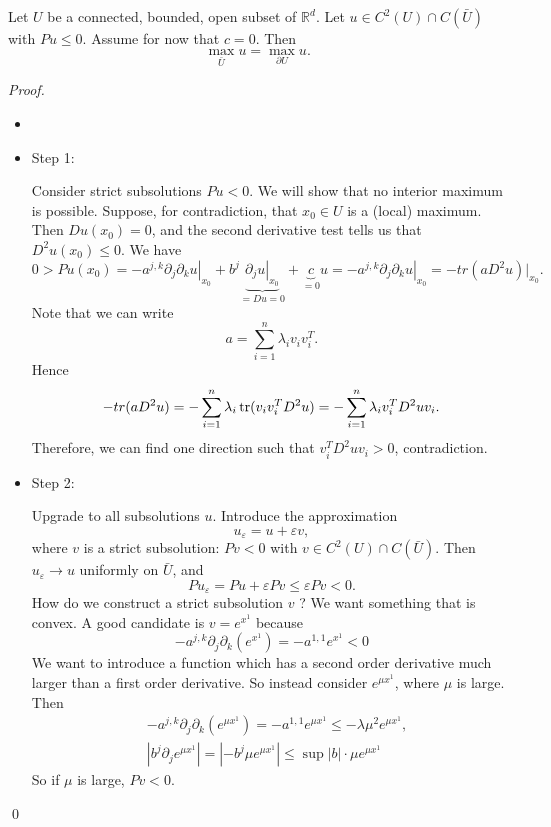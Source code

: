 \begin{theorem}
\label{thm: Weak maximum principle}
 Let $U$ be a connected, bounded, open subset of $\mathbb{R}^{d}$. Let $u \in C^{2}(U) \cap C(\bar{U})$ with $P u \leq 0$. Assume for now that $c=0$. Then
$$
\max _{\bar{U}} u=\max _{\partial U} u \text {. }
$$
\end{theorem}
\begin{proof}
\begin{itemize}
    \item []
    \item Step 1: 

     Consider strict subsolutions $P u<0$. We will show that no interior maximum is possible. Suppose, for contradiction, that $x_{0} \in U$ is a (local) maximum. Then $D u\left(x_{0}\right)=0$, and the second derivative test tells us that $D^{2} u\left(x_{0}\right) \leq 0$. We have
    $$
    0>P u\left(x_{0}\right) = -\left.a^{j, k} \partial_{j} \partial_{k} u\right|_{x_{0}}+b^{j} \underbrace{\left.\partial_{j} u\right|_{x_{0}}}_{=D u=0}+\underbrace{c}_{=0} u = -\left.a^{j, k} \partial_{j} \partial_{k} u\right|_{x_{0}} = -tr(aD^2 u)|_{x_0}.
    $$
    Note that we can write 
    \[
        a = \sum_{i=1}^n \lambda_i v_i v_i^T. 
    \]
    Hence 
    \[
        -tr(aD^2 u) = - \sum_{i=1}^n \lambda_i \mathop{\mathrm{tr}}(v_iv_i^T D^2u) = - \sum_{i=1}^n \lambda_i v_i^T D^2u v_i.
    \]
    Therefore, we can find one direction such that $v_i^T D^2u v_i >0$, contradiction. 
    \item Step 2: 

    Upgrade to all subsolutions $u$. Introduce the approximation
    $$
    u_{\varepsilon}=u+\varepsilon v,
    $$
    where $v$ is a strict subsolution: $P v<0$ with $v \in C^{2}(U) \cap C(\bar{U})$. Then $u_{\varepsilon} \rightarrow u$ uniformly on $\bar{U}$, and
    $$
    P u_{\varepsilon}=P u+\varepsilon P v \leq \varepsilon P v<0 .
    $$
    How do we construct a strict subsolution $v$ ? We want something that is convex. A good candidate is $v=e^{x^{1}}$ because
    $$
    -a^{j, k} \partial_{j} \partial_{k}\left(e^{x^{1}}\right)=-a^{1,1} e^{x^{1}}<0
    $$
    We want to introduce a function which has a second order derivative much larger than a first order derivative. So instead consider $e^{\mu x^{1}}$, where $\mu$ is large. Then
    $$
    \begin{aligned}
    &-a^{j, k} \partial_{j} \partial_{k}\left(e^{\mu x^{1}}\right)=-a^{1,1} e^{\mu x^{1}} \leq-\lambda \mu^{2} e^{\mu x^{1}}, \\
    &\left|b^{j} \partial_{j} e^{\mu x^{1}}\right|=\left|-b^{j} \mu e^{\mu x^{1}}\right| \leq \sup |b| \cdot \mu e^{\mu x^{1}}
    \end{aligned}
    $$
    So if $\mu$ is large, $P v<0$.
\end{itemize}
\qed
\end{proof}


